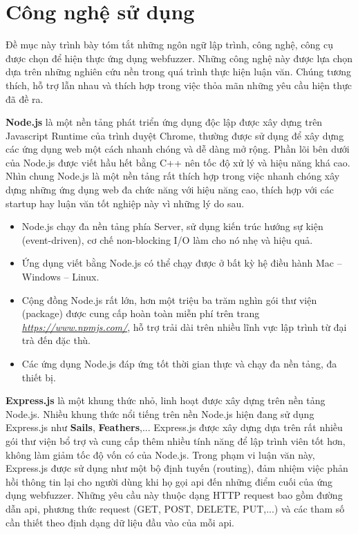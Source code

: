\section{Công nghệ sử dụng}
Đề mục này trình bày tóm tắt những ngôn ngữ lập trình, công nghệ, công cụ được chọn để hiện thực ứng dụng webfuzzer. Những công nghệ này được lựa chọn dựa trên những nghiên cứu nền trong quá trình thực hiện luận văn. Chúng tương thích, hỗ trợ lẫn nhau và thích hợp trong việc thỏa mãn những yêu cầu hiện thực đã đề ra.\par
\textbf{Node.js} là một nền tảng phát triển ứng dụng độc lập được xây dựng trên Javascript Runtime của trình duyệt Chrome, thường được sử dụng để xây dựng các ứng dụng web một cách nhanh chóng và dễ dàng mở rộng. Phần lõi bên dưới của Node.js được viết hầu hết bằng C++ nên tốc độ xử lý và hiệu năng khá cao. Nhìn chung Node.js là một nền tảng rất thích hợp trong việc nhanh chóng xây dựng những ứng dụng web đa chức năng với hiệu năng cao, thích hợp với các startup hay luận văn tốt nghiệp này vì những lý do sau.
\begin{itemize}
    \item Node.js chạy đa nền tảng phía Server, sử dụng kiến trúc hướng sự kiện (event-driven), cơ chế non-blocking I/O làm cho nó nhẹ và hiệu quả.
    \item Ứng dụng viết bằng Node.js có thể chạy được ở bất kỳ hệ điều hành Mac – Windows – Linux.
    \item Cộng đồng Node.js rất lớn, hơn một triệu ba trăm nghìn gói thư viện (package) được cung cấp hoàn toàn miễn phí trên trang \href{https://www.npmjs.com/}{\textit{https://www.npmjs.com/}}, hỗ trợ trải dài trên nhiều lĩnh vực lập trình từ đại trà đến đặc thù.
    \item Các ứng dụng Node.js đáp ứng tốt thời gian thực và chạy đa nền tảng, đa thiết bị.
\end{itemize}
\textbf{Express.js} là một khung thức nhỏ, linh hoạt được xây dựng trên nền tảng Node.js. Nhiều khung thức nổi tiếng trên nền Node.js hiện đang sử dụng Express.js như \textbf{Sails}, \textbf{Feathers},... Express.js được xây dựng dựa trên rất nhiều gói thư viện bổ trợ và cung cấp thêm nhiều tính năng để lập trình viên tốt hơn, không làm giảm tốc độ vốn có của Node.js. Trong phạm vi luận văn này, Express.js được sử dụng như một bộ định tuyến (routing), đảm nhiệm việc phản hồi thông tin lại cho người dùng khi họ gọi \acrshort{api} đến những điểm cuối của ứng dụng webfuzzer. Những yêu cầu này thuộc dạng HTTP request bao gồm đường dẫn \acrshort{api}, phương thức request (GET, POST, DELETE, PUT,...) và các tham số cần thiết theo định dạng dữ liệu đầu vào của mỗi \acrshort{api}. \par
